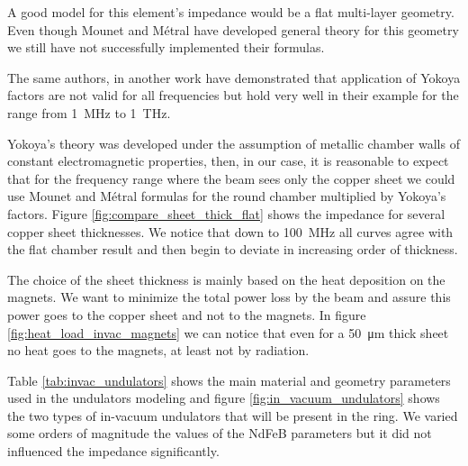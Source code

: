A good model for this element's impedance would be a flat multi-layer geometry. Even though Mounet and Métral \cite{mounet_metral2010} have developed general theory for this geometry we still have not successfully implemented their formulas.

The same authors, in another work \cite{mounet_metralhb2010} have demonstrated that application of Yokoya factors \cite{yokoya1993} are not valid for all frequencies but hold very well in their example for the range from \SI{1}{\mega\hertz} to \SI{1}{\tera\hertz}. 

Yokoya's theory was developed under the assumption of metallic chamber walls of constant electromagnetic properties, then, in our case, it is reasonable to expect that for the frequency range where the beam sees only the copper sheet we could use Mounet and Métral formulas for the round chamber multiplied by Yokoya's factors. Figure \ref{fig:compare_sheet_thick_flat} shows the impedance for several copper sheet thicknesses. We notice that down to \SI{100}{\mega\hertz} all curves agree with the flat chamber result and then begin to deviate in increasing order of thickness.


The choice of the sheet thickness is mainly based on the heat deposition on the magnets. We want to minimize the total power loss by the beam and assure this power goes to the copper sheet and not to the magnets. In figure \ref{fig:heat_load_invac_magnets} we can notice that even for a \SI{50}{\micro\meter} thick sheet no heat goes to the magnets, at least not by radiation.


Table \ref{tab:invac_undulators} shows the main material and geometry parameters used in the undulators modeling and figure \ref{fig:in_vacuum_undulators} shows the two types of in-vacuum undulators that will be present in the ring. We varied some orders of magnitude the values of the NdFeB parameters but it did not influenced the impedance significantly.

